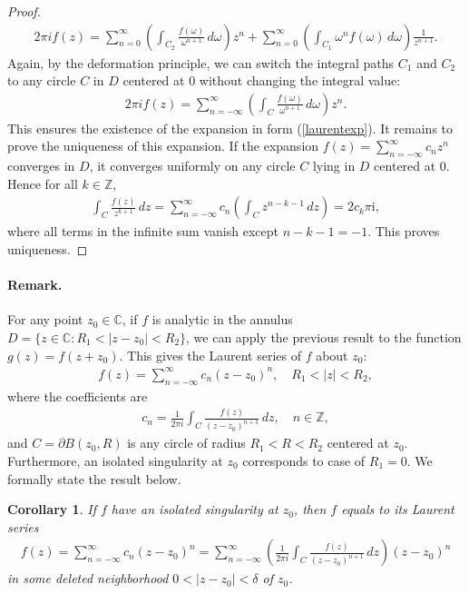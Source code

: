 \documentclass{article}
\numberwithin{equation}{section}
\newcommand{\bbC}{\mathbb{C}}
\newcommand{\bbZ}{\mathbb{Z}}
\renewcommand{\i}{\mathrm{i}}
\theoremstyle{plain}
\newtheorem{corollary}[theorem]{Corollary}
\theoremstyle{definition}
\begin{document}
\begin{proof}
\begin{align*}
	2\pi i f(z)=\sum_{n=0}^\infty\left(\int_{C_2}\frac{f(\omega)}{\omega^{n+1}}\,d\omega\right) z^n + \sum_{n=0}^\infty\left(\int_{C_1}\omega^nf(\omega)\,d\omega\right)\frac{1}{z^{n+1}}.
\end{align*}
Again, by the deformation principle, we can switch the integral paths $C_1$ and $C_2$ to any circle $C$ in $D$ centered at $0$ without changing the integral value:
\begin{align*}
	2\pi i f(z)=\sum_{n=-\infty}^\infty\left(\int_C\frac{f(\omega)}{\omega^{n+1}}\,d\omega\right)z^n.
\end{align*}
This ensures the existence of the expansion in form (\ref{laurentexp}). It remains to prove the uniqueness of this expansion. If the expansion $f(z)=\sum_{n=-\infty}^\infty c_nz^n$ converges in $D$, it converges uniformly on any circle $C$ lying in $D$ centered at $0$. Hence for all $k\in\bbZ$,
\begin{align*}
	\int_C\frac{f(z)}{z^{k+1}}\,dz=\sum_{n=-\infty}^\infty c_n\left(\int_C z^{n-k-1}\,dz\right)=2c_k\pi\i,
\end{align*}
where all terms in the infinite sum vanish except $n-k-1=-1$. This proves uniqueness.
\end{proof}
\paragraph{Remark.} For any point $z_0\in\bbC$, if $f$ is analytic in the annulus $D=\{z\in\bbC:R_1<\vert z-z_0\vert<R_2\}$, we can apply the previous result to the function $g(z)=f(z+z_0)$. This gives the Laurent series of $f$ about $z_0$:
\begin{align*}
	f(z)=\sum_{n=-\infty}^\infty c_n(z-z_0)^n,\quad R_1<\vert z\vert<R_2,
\end{align*}
where the coefficients are
\begin{align*}
	c_n=\frac{1}{2\pi i}\int_C\frac{f(z)}{(z-z_0)^{n+1}}\,dz,\quad n\in\bbZ,
\end{align*}
and $C=\partial B(z_0,R)$ is any circle of radius $R_1<R<R_2$ centered at $z_0$. Furthermore, an isolated singularity at $z_0$ corresponds to case of $R_1=0$. We formally state the result below.

\begin{corollary}
If $f$ have an isolated singularity at $z_0$, then $f$ equals to its Laurent series
\begin{align*}
	f(z)=\sum_{n=-\infty}^\infty c_n(z-z_0)^n=\sum_{n=-\infty}^\infty\left(\frac{1}{2\pi i}\int_C\frac{f(z)}{(z-z_0)^{n+1}}\,dz\right)(z-z_0)^n
\end{align*}
in some deleted neighborhood $0<\vert z-z_0\vert<\delta$ of $z_0$. 
\end{corollary}
\end{document}
